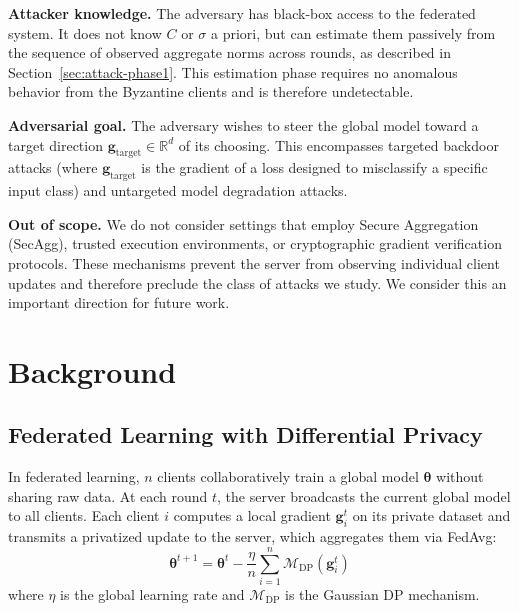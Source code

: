 \documentclass[conference]{IEEEtran}
\begin{document}
\textbf{Attacker knowledge.} The adversary has black-box
access to the federated system. It does not know $C$ or
$\sigma$ a priori, but can estimate them passively from
the sequence of observed aggregate norms across rounds,
as described in Section~\ref{sec:attack-phase1}. This
estimation phase requires no anomalous behavior from the
Byzantine clients and is therefore undetectable.

\textbf{Adversarial goal.} The adversary wishes to steer
the global model toward a target direction
$\mathbf{g}_{\text{target}} \in \mathbb{R}^d$ of its
choosing. This encompasses targeted backdoor attacks
(where $\mathbf{g}_{\text{target}}$ is the gradient of
a loss designed to misclassify a specific input class)
and untargeted model degradation attacks.

\textbf{Out of scope.} We do not consider settings that
employ Secure Aggregation (SecAgg), trusted execution
environments, or cryptographic gradient verification
protocols. These mechanisms prevent the server from
observing individual client updates and therefore
preclude the class of attacks we study. We consider
this an important direction for future work.

\section{Background}

\subsection{Federated Learning with Differential Privacy}

In federated learning, $n$ clients collaboratively train a
global model $\boldsymbol{\theta}$ without sharing raw data.
At each round $t$, the server broadcasts the current global
model to all clients. Each client $i$ computes a local
gradient $\mathbf{g}_i^t$ on its private dataset and
transmits a privatized update to the server, which
aggregates them via FedAvg:
\begin{equation}
    \boldsymbol{\theta}^{t+1} = \boldsymbol{\theta}^t
    - \frac{\eta}{n} \sum_{i=1}^{n}
    \mathcal{M}_{\mathrm{DP}}(\mathbf{g}_i^t)
\end{equation}
where $\eta$ is the global learning rate and
$\mathcal{M}_{\mathrm{DP}}$ is the Gaussian DP mechanism.
\end{document}
